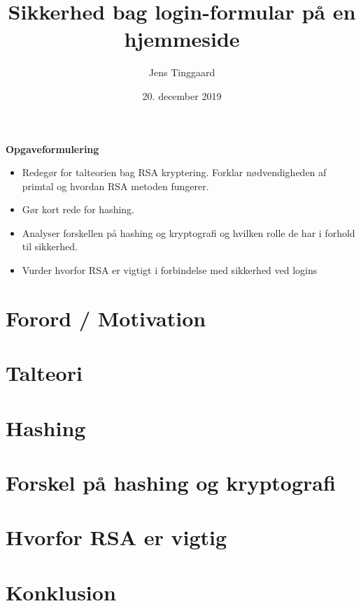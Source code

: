 \documentclass[a4paper, 12pt]{article}
\date{20. december 2019}
\title{Sikkerhed bag login-formular på en hjemmeside}
\author{Jens Tinggaard}
\theoremstyle{break}
\theoremstyle{breakline}
\numberwithin{equation}{section}
\begin{document}
\thispagestyle{empty}

\begin{center}
    \LARGE
    \textbf{Opgaveformulering}
\end{center}

{
\large
\begin{itemize}
    \item Redegør for talteorien bag RSA kryptering. Forklar nødvendigheden af primtal og hvordan RSA metoden fungerer.
    \item Gør kort rede for hashing.
    \item Analyser forskellen på hashing og kryptografi og hvilken rolle de har i forhold til sikkerhed.
    \item Vurder hvorfor RSA er vigtigt i forbindelse med sikkerhed ved logins
\end{itemize}
}





\tableofcontents


\newpage
\section*{Forord / Motivation}



\newpage
\section{Talteori}\label{sec:numtheory}



\newpage
\section{Hashing}



\newpage
\section{Forskel på hashing og kryptografi}



\newpage
\section{Hvorfor RSA er vigtig}



\newpage
\section*{Konklusion}







\newpage
\setlength\bibitemsep{10pt}
\printbibliography[
heading=bibintoc, %
title={Litteratur} %
]

\newpage
\begin{appendices}
    
\end{appendices}
\end{document}
